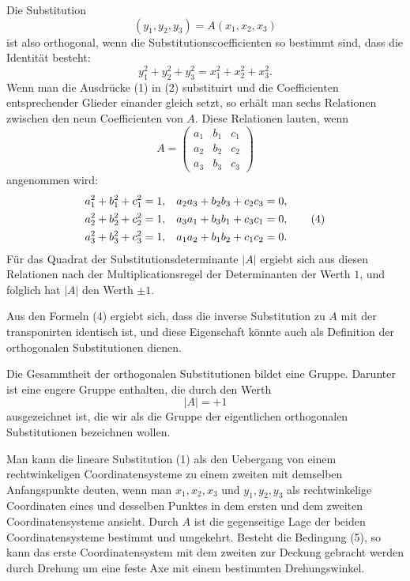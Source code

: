 \documentclass[11pt]{article}
\begin{document}
Die Substitution
\begin{equation}
(y_1,y_2,y_3)=A(x_1,x_2,x_3)
\tag{1}
\end{equation}
ist also orthogonal, wenn die Substitutionscoefficienten so bestimmt sind, dass die Identität besteht:
\begin{equation}
y_1^2+y_2^2+y_3^2=x_1^2+x_2^2+x_3^2.
\tag{2}
\end{equation}
Wenn man die Ausdrücke (1) in (2) substituirt und die Coefficienten entsprechender Glieder einander gleich setzt, so erhält man sechs Relationen zwischen den neun Coefficienten von $A$. Diese Relationen lauten, wenn
\begin{equation}
A=\begin{pmatrix}a_1&b_1&c_1\\a_2&b_2&c_2\\a_3&b_3&c_3\end{pmatrix}
\tag{3}
\end{equation}
angenommen wird:
\begin{align}
a_1^2+b_1^2+c_1^2&=1,& a_2a_3+b_2b_3+c_2c_3&=0,\notag\\
a_2^2+b_2^2+c_2^2&=1,& a_3a_1+b_3b_1+c_3c_1&=0,\tag{4}\\
a_3^2+b_3^2+c_3^2&=1,& a_1a_2+b_1b_2+c_1c_2&=0.\notag
\end{align}
Für das Quadrat der Substitutionsdeterminante $|A|$ ergiebt sich aus diesen Relationen nach der Multiplicationsregel der Determinanten der Werth $1$, und folglich hat $|A|$ den Werth $\pm1$.

Aus den Formeln (4) ergiebt sich, dass die inverse Substitution zu $A$ mit der transponirten identisch ist, und diese Eigenschaft könnte auch als Definition der orthogonalen Substitutionen dienen.

Die Gesammtheit der orthogonalen Substitutionen bildet eine Gruppe. Darunter ist eine engere Gruppe enthalten, die durch den Werth
\begin{equation}
|A|=+1
\tag{5}
\end{equation}
ausgezeichnet ist, die wir als die Gruppe der eigentlichen orthogonalen Substitutionen bezeichnen wollen.

Man kann die lineare Substitution (1) als den Uebergang von einem rechtwinkeligen Coordinatensysteme zu einem zweiten mit demselben Anfangspunkte deuten, wenn man $x_1,x_2,x_3$ und $y_1,y_2,y_3$ als rechtwinkelige Coordinaten eines und desselben Punktes in dem ersten und dem zweiten Coordinatensysteme ansieht. Durch $A$ ist die gegenseitige Lage der beiden Coordinatensysteme bestimmt und umgekehrt. Besteht die Bedingung (5), so kann das erste Coordinatensystem mit dem zweiten zur Deckung gebracht werden durch Drehung um eine feste Axe mit einem bestimmten Drehungswinkel.
\end{document}
